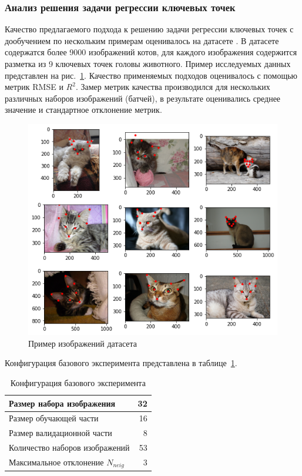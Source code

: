 \documentclass[a4paper,14pt]{article}
\begin{document}
    \subsubsection{Анализ решения задачи регрессии ключевых точек} \label{kpoints_exp}

    Качество предлагаемого подхода к решению задачи регрессии ключевых точек с дообучением по нескольким примерам оценивалось на датасете \cite{cat_dataset}.
    В датасете содержатся более 9000 изображений котов, для каждого изображения содержится разметка из 9 ключевых точек головы животного.
    Пример исследуемых данных представлен на рис.~\ref{fig:example_cat_dataset}.
    Качество применяемых подходов оценивалось с помощью метрик RMSE и $R^2$.
    Замер метрик качества производился для нескольких различных наборов изображений (батчей), в результате оценивались среднее значение и стандартное отклонение метрик.

    \begin{figure}[H]
        \centering
        \includegraphics[width=0.6\linewidth]{images/example_cat_dataset}
        \caption{Пример изображений датасета \cite{cat_dataset}}
        \label{fig:example_cat_dataset}
    \end{figure}

    Конфигурация базового эксперимента представлена в таблице~\ref{tab:base_config}.
    \begin{center}
        \begin{table}[H]
            \centering
            \caption{Конфигурация базового эксперимента}
            \label{tab:base_config}
            \bgroup
            \def\arraystretch{1.5}
            \begin{tabular}{| l | r |}
                \hline
                Размер набора изображения         & 32 \\ \hline
                Размер обучающей части            & 16 \\ \hline
                Размер валидационной части            & 8 \\ \hline
                Количество наборов изображений    & 53 \\ \hline
                Максимальное отклонение  $N_{neig}$ & 3  \\
                \hline
            \end{tabular}
            \egroup
        \end{table}
    \end{center}
\end{document}
